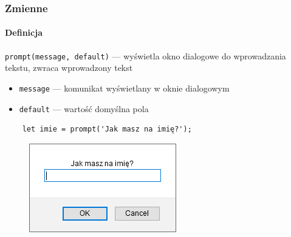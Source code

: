 \begin{frame}[fragile]
  \frametitle{Zmienne}
  \framesubtitle{Definicja}

  \verb|prompt(message, default)| --- wyświetla okno dialogowe do wprowadzania tekstu, zwraca wprowadzony tekst

  \begin{itemize}
      \item \verb|message| --- komunikat wyświetlany w oknie dialogowym 
      \item \verb|default| --- wartość domyślna pola 
  \end{itemize}
  
  \begin{verbatim}
    let imie = prompt('Jak masz na imię?');
  \end{verbatim}

  \begin{figure}
    \includegraphics[scale=0.5]{images/js-prompt-example}
  \end{figure}
\end{frame}









